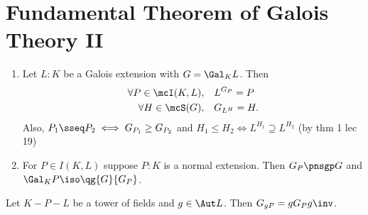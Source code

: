 \documentclass[a4paper]{article}
\begin{document}
\section{Fundamental Theorem of Galois Theory II}
\begin{ttheorem}\label{tm:gal-cor}
  \begin{enumerate}
    \item Let \( L:K \) be a Galois extension with \( G=\Gal_K L \).
      Then \begin{align*}
        \forall P\in \mcI(K,L), \quad &L^{G_P} = P \\
        \forall H\in \mcS(G), \quad &G_{L^H} = H.
      \end{align*}
      Also, \( P_1\sseq P_2 \iff G_{P_1}\ge G_{P_2} \) and \( H_1 \le H_2 \iff L^{H_1}\supseteq L^{H_2} \) (by thm 1 lec 19)
    \item For \( P\in I(K,L) \) suppose \( P:K \) is a normal extension.
      Then \( G_P\pnsgp G \) and \( \Gal_K P \iso \qg{G}{G_P} \).
  \end{enumerate}
\end{ttheorem}

\begin{tlemma}
  Let \( K-P-L \) be a tower of fields and \( g\in \Aut L \).
  Then \( G_{gP} = gG_Pg\inv \).
\end{tlemma}


\end{document}

